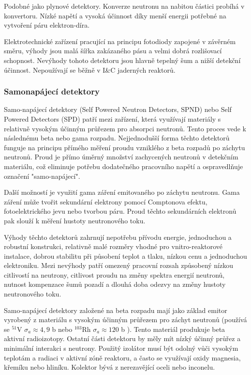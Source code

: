Podobné jako plynové detektory. Konverze neutronu na nabitou částici probíhá v konvertoru. Nízké napětí a vysoká účinnost díky menší energii potřebné na vytvoření páru elektron-díra.

Elektrotechnické zařízení pracující na principu
fotodiody zapojené v závěrném směru, výhody
jsou malá šířka zakázaného pásu a velmi dobrá
rozlišovací schopnost. Nevýhody tohoto detektoru jsou hlavně tepelný šum a nižší detekční účinnost. Nepoužívají se běžně v I\&C jaderných reaktorů.

\subsubsection{Samonapájecí detektory}

Samo-napájecí detektory (Self Powered Neutron Detectors, SPND) nebo Self Powered Detectors (SPD) patří mezi zařízení, která využívají materiály s relativně vysokým účinným průřezem pro absorpci neutronů. Tento proces vede k následnému beta nebo gama rozpadu. Nejjednodušší forma těchto detektorů funguje na principu přímého měření proudu vzniklého z beta rozpadů po záchytu neutronů. Proud je přímo úměrný množství zachycených neutronů v detekčním materiálu, což eliminuje potřebu dodatečného pracovního napětí a ospravedlňuje označení "samo-napájecí".

Další možností je využití gama záření emitovaného po záchytu neutronu. Gama záření může tvořit sekundární elektrony pomocí Comptonova efektu, fotoelektrického jevu nebo tvorbou páru. Proud těchto sekundárních elektronů pak slouží k měření hustoty neutronového toku.

Výhody těchto detektorů zahrnují nepotřebu přívodu energie, jednoduchou a robustní konstrukci, relativně malé rozměry vhodné pro vnitro-reaktorové instalace, dobrou stabilitu při působení teplot a tlaku, nízkou cenu a jednoduchou elektroniku. Mezi nevýhody patří omezený pracovní rozsah způsobený nízkou citlivostí na neutrony, citlivost proudu na změny spektra energií neutronů, nutnost kompenzace šumů pozadí a dlouhá doba odezvy na změny hustoty neutronového toku.

Samo-napájecí detektory založené na beta rozpadu mají jako základ emitor vyrobený z materiálu s vysokým účinným průřezem pro záchyt neutronů (používá se $^{51}$V $\sigma_a\approx4,9$ b nebo $^{103}$Rh $\sigma_a\approx120$ b ). Tento materiál produkuje beta aktivní radioizotopy. Ostatní části detektoru by měly mít nízký účinný průřez a minimální interakci s neutrony. Použitý izolátor musí být odolný vůči vysokým teplotám a radiaci v aktivní zóně reaktoru, a často se využívají oxidy magnesia, křemíku nebo hliníku. Kolektor bývá z nerezavějící oceli nebo inconelu. 

